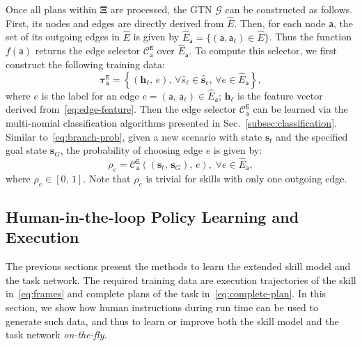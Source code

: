 Once all plans within $\boldsymbol{\Xi}$ are processed, the GTN $\mathcal{G}$ can be constructed as follows.
First, its nodes and edges are directly derived from $\widehat{E}$.
Then, for each node $\mathsf{a}$, the set of its outgoing edges in $\widehat{E}$ is given by $\widehat{E}_{\mathsf{a}}=\{(\mathsf{a}, \mathsf{a}_\ell) \in \widehat{E}\}$.
Thus the function $f(\mathsf{a})$ returns the edge selector $\mathcal{C}_{\mathsf{a}}^{\texttt{E}}$ over $\widehat{E}_{\mathsf{a}}$.
To compute this selector, we first construct the following training data:
\begin{equation}\label{eq:node-data}
\boldsymbol{\tau}^{\texttt{E}}_{\mathsf{a}} = \left\{ (\mathbf{h}_\ell,\, e),\, \forall \widehat{s}_\ell \in  \widehat{\mathbf{s}}_e,\, \forall e\in \widehat{E}_{\mathsf{a}} \right\},
\end{equation}
where $e$ is the label for an edge $e = (\mathsf{a},\,\mathsf{a}_\ell)\in \widehat{E}_{\mathsf{a}}$;
$\mathbf{h}_\ell$ is the feature vector derived from~\eqref{eq:edge-feature}.
Then the edge selector $\mathcal{C}_{\mathsf{a}}^{\texttt{E}}$ can be learned via the multi-nomial classification algorithms presented in Sec.~\ref{subsec:classification}.
Similar to~\eqref{eq:branch-prob}, 
given a new scenario with state $\mathbf{s}_t$ and the specified goal state $\mathbf{s}_G$,
the probability of choosing edge $e$ is given by:
\begin{equation}\label{eq:edge-prob}
\rho_{e} = \mathcal{C}_{\mathsf{a}}^{\texttt{E}}\left((\mathbf{s}_t,\,\mathbf{s}_G),\, e\right), \;\forall e \in \widehat{E}_{\mathsf{a}},
\end{equation}
where $\rho_{e}\in [0,\,1]$.
Note that $\rho_{e}$ is trivial for skills with only one outgoing edge.


\subsection{Human-in-the-loop Policy Learning and Execution}\label{subsec:learn-policy}
The previous sections present the methods to learn the extended skill model and the task network.
The required training data are execution trajectories of the skill in~\eqref{eq:frames} and complete plans of the task in~\eqref{eq:complete-plan}.
In this section, we show how human instructions during run time can be used to generate such data, 
and thus to learn or improve both the skill model and the task network \emph{on-the-fly}. 


